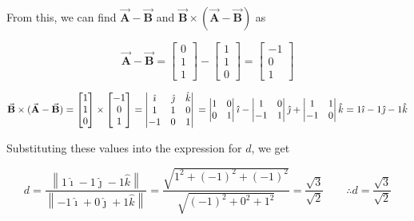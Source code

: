 From this, we can find \( \vec{\mathbf{A}} - \vec{\mathbf{B}} \) and \( \vec{\mathbf{B}} \times (\vec{\mathbf{A}} - \vec{\mathbf{B}}) \) as

\[
    \vec{\mathbf{A}} - \vec{\mathbf{B}} = \begin{bmatrix} 0 \\ 1 \\ 1 \end{bmatrix} - \begin{bmatrix} 1 \\ 1 \\ 0 \end{bmatrix} = \begin{bmatrix} -1 \\ 0 \\ 1 \end{bmatrix}
\]

\[
    \vec{\mathbf{B}} \times (\vec{\mathbf{A}} - \vec{\mathbf{B}})
    = \begin{bmatrix} 1 \\ 1 \\ 0 \end{bmatrix} \times \begin{bmatrix} -1 \\ 0 \\ 1 \end{bmatrix}
    = \begin{vmatrix} \hat{\imath} & \hat{\jmath} & \hat{k} \\ 1 & 1 & 0 \\ -1 & 0 & 1 \end{vmatrix} \\
    = \begin{vmatrix} 1 & 0 \\ 0 & 1 \end{vmatrix} \hat{\imath} - \begin{vmatrix} 1 & 0 \\ -1 & 1 \end{vmatrix} \hat{\jmath} + \begin{vmatrix} 1 & 1 \\ -1 & 0 \end{vmatrix} \hat{k}
    = 1 \hat{\imath} - 1 \hat{\jmath} - 1 \hat{k}
\]

Substituting these values into the expression for \( d \), we get

\[
    d = \frac{\left\lVert 1 \hat{\imath} - 1 \hat{\jmath} - 1 \hat{k} \right\rVert}{\left\lVert -1 \hat{\imath} + 0 \hat{\jmath} + 1 \hat{k} \right\rVert}
    = \frac{\sqrt{1^2 + {(-1)}^2 + {(-1)}^2}}{\sqrt{{(-1)}^2 + 0^2 + 1^2}}
    = \frac{\sqrt{3}}{\sqrt{2}}
    \qquad
    \boxed{
        \therefore
        d = \frac{\sqrt{3}}{\sqrt{2}}
    }
\]

